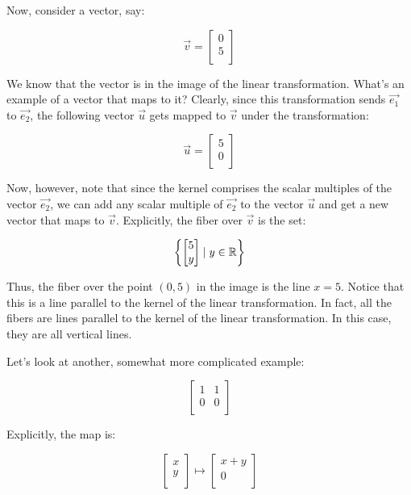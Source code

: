 \documentclass[10pt]{amsart}
\begin{document}
Now, consider a vector, say:

$$\vec{v} = \left[ \begin{matrix} 0 \\ 5 \\ \end{matrix}\right]$$

We know that the vector is in the image of the linear
transformation. What's an example of a vector that maps to it?
Clearly, since this transformation sends $\vec{e_1}$ to $\vec{e_2}$,
the following vector $\vec{u}$ gets mapped to $\vec{v}$ under the
transformation:

$$\vec{u} = \left[ \begin{matrix} 5 \\ 0 \\\end{matrix}\right]$$

Now, however, note that since the kernel comprises the scalar
multiples of the vector $\vec{e_2}$, we can add any scalar multiple of
$\vec{e_2}$ to the vector $\vec{u}$ and get a new vector that maps to
$\vec{v}$. Explicitly, the fiber over $\vec{v}$ is the set:

$$\left\{ \left[\begin{matrix} 5 \\ y \\\end{matrix}\right] \mid y \in \mathbb{R} \right \}$$

Thus, the fiber over the point $(0,5)$ in the image is the line $x =
5$. Notice that this is a line parallel to the kernel of the linear
transformation. In fact, all the fibers are lines parallel to the
kernel of the linear transformation. In this case, they are all
vertical lines.

Let's look at another, somewhat more complicated example:

$$\left[\begin{matrix} 1 & 1 \\ 0 & 0 \\\end{matrix}\right]$$

Explicitly, the map is:

$$\left[\begin{matrix} x \\ y \\\end{matrix}\right] \mapsto \left[\begin{matrix} x + y \\ 0 \\\end{matrix}\right]$$
\end{document}
